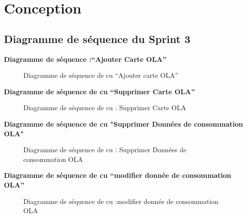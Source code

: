 \documentclass[a4paper,11pt]{report}
\begin{document}
\section{Conception}
\subsection{Diagramme de séquence du Sprint 3}

\newpage
\textbf{Diagramme de séquence :“Ajouter Carte OLA” }

\begin{figure}[H]
  \centering
  \setlength{\fboxrule}{1pt}
  \setlength{\fboxsep}{3pt}
  \caption{Diagramme de séquence de cu “Ajouter carte OLA”
 }
  \label{fig:clone-result}
\end{figure}

\newpage
\textbf{Diagramme de séquence de cu “Supprimer Carte OLA”
 }

\begin{figure}[H]
  \centering
  \setlength{\fboxrule}{1pt}
  \setlength{\fboxsep}{3pt}
  \caption{ Diagramme de séquence de cu : Supprimer Carte OLA
 }
  \label{fig:clone-result}
\end{figure}




\newpage
\textbf{ Diagramme de séquence de cu "Supprimer  Données de consommation OLA"
 }

\begin{figure}[H]
  \centering
  \setlength{\fboxrule}{1pt}
  \setlength{\fboxsep}{3pt}
  \caption{ Diagramme de séquence de cu : Supprimer  Données de consommation OLA
 }
  \label{fig:clone-result}
\end{figure}


\newpage
\textbf{ Diagramme de séquence de cu “modifier donnée de consommation OLA”}

\begin{figure}[H]
  \centering
  \setlength{\fboxrule}{1pt}
  \setlength{\fboxsep}{3pt}
  \caption{ Diagramme de séquence de cu :modifier donnée de consommation OLA
 }
  \label{fig:clone-result}
\end{figure}
\end{document}

